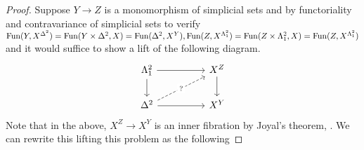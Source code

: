 \begin{proof}
  Suppose $Y\to Z$ is a monomorphism of simplicial sets and by functoriality and contravariance of simplicial sets to verify $\mathrm{Fun}(Y,X^{\Delta^{2}})=\mathrm{Fun}(Y\times\Delta^{2},X)=\mathrm{Fun}(\Delta^{2},X^{Y}), \mathrm{Fun}(Z,X^{\Lambda^{2}_{1}})=\mathrm{Fun}(Z\times\Lambda^{2}_{1},X)=\mathrm{Fun}(Z,X^{\Lambda^{2}_{1}})$ and it would suffice to show a lift of the following diagram. 
  $$%
  \begin{tikzcd}
    {\Lambda^{2}_{1}} && {X^{Z}} \\
    {\Delta^{2}} && {X^{Y}}
    \arrow[from=2-1, to=2-3]
    \arrow[from=1-3, to=2-3]
    \arrow[from=1-1, to=2-1]
    \arrow[from=1-1, to=1-3]
    \arrow["{?}"{description}, dashed, from=2-1, to=1-3]
  \end{tikzcd}$$
  Note that in the above, $X^{Z}\to X^{Y}$ is an inner fibration by Joyal's theorem, . We can rewrite this lifting this problem as the following 


\end{proof}